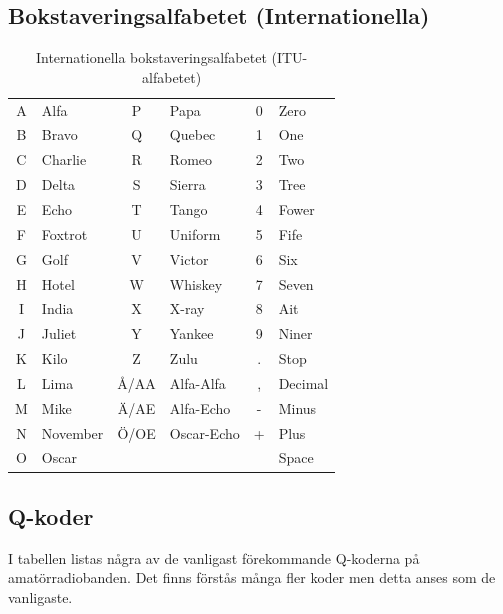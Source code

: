 \subsection{Bokstaveringsalfabetet (Internationella)}
\begin{table}[H]
\centering
\begin{tabular}{cl|cl|cl}
	A & Alfa     &  P   & Papa       & 0 & Zero    \\
	B & Bravo    &  Q   & Quebec     & 1 & One     \\
	C & Charlie  &  R   & Romeo      & 2 & Two     \\
	D & Delta    &  S   & Sierra     & 3 & Tree    \\
	E & Echo     &  T   & Tango      & 4 & Fower   \\
	F & Foxtrot  &  U   & Uniform    & 5 & Fife    \\
	G & Golf     &  V   & Victor     & 6 & Six     \\
	H & Hotel    &  W   & Whiskey    & 7 & Seven   \\
	I & India    &  X   & X-ray      & 8 & Ait     \\
	J & Juliet   &  Y   & Yankee     & 9 & Niner   \\
	K & Kilo     &  Z   & Zulu       & . & Stop    \\
	L & Lima     & Å/AA & Alfa-Alfa  & , & Decimal \\
	M & Mike     & Ä/AE & Alfa-Echo  & - & Minus   \\
	N & November & Ö/OE & Oscar-Echo & + & Plus    \\
	O & Oscar    &      &            &   & Space   \\
\end{tabular}
\caption{Internationella bokstaveringsalfabetet (ITU-alfabetet)}
\end{table}

\subsection{Q-koder}
I tabellen listas några av de vanligast förekommande Q-koderna på amatörradiobanden. 
Det finns förstås många fler koder men detta anses som de vanligaste.

